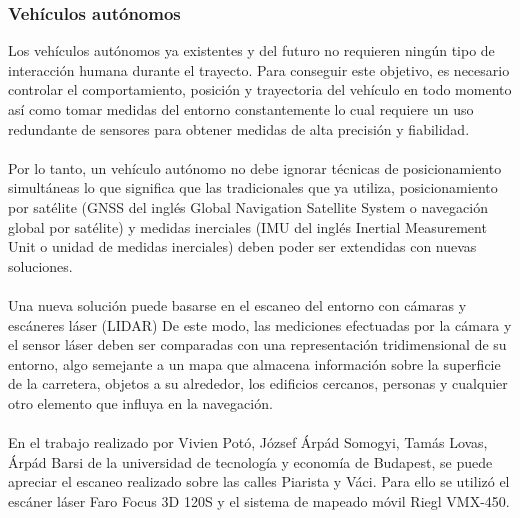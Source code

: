 





\subsubsection{Vehículos autónomos}
Los vehículos autónomos ya existentes y del futuro no requieren ningún tipo de interacción humana durante el trayecto. Para conseguir este objetivo, es necesario controlar el comportamiento, posición y trayectoria del vehículo en todo momento así como tomar medidas del entorno constantemente lo cual requiere un uso redundante de sensores para obtener medidas de alta precisión y fiabilidad.
\\
\\
Por lo tanto, un vehículo autónomo no debe ignorar técnicas de posicionamiento simultáneas lo que significa que las tradicionales que ya utiliza, posicionamiento por satélite (GNSS del inglés Global Navigation Satellite System o navegación global por satélite) y medidas inerciales (IMU del inglés Inertial Measurement Unit o unidad de medidas inerciales) deben poder ser extendidas con nuevas soluciones.
\\
\\
Una nueva solución puede basarse en el escaneo del entorno con cámaras y escáneres láser (LIDAR) De este modo, las mediciones efectuadas por la cámara y el sensor láser deben ser comparadas con una representación tridimensional de su entorno, algo semejante a un mapa que almacena información sobre la superficie de la carretera, objetos a su alrededor, los edificios cercanos, personas y cualquier otro elemento que influya en la navegación.
\\
\\
En el trabajo realizado por Vivien Potó, József Árpád Somogyi, Tamás Lovas, Árpád Barsi\cite{vehiculos_autonomos} de la universidad de tecnología y economía de Budapest, se puede apreciar el escaneo realizado sobre las calles Piarista y Váci. Para ello se utilizó el escáner láser Faro Focus 3D 120S\cite{faro} y el sistema de mapeado móvil Riegl VMX-450\cite{riegl_450}.
